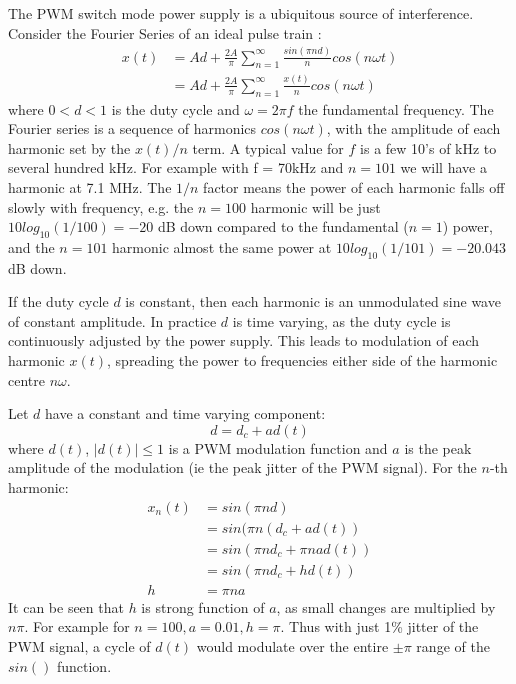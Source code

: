 \documentclass{article}
\begin{document}
The PWM switch mode power supply is a ubiquitous source of interference.  Consider the Fourier Series of an ideal pulse train \cite{wikipedia_pulse}:
\begin{equation} \label{eq_pwm}
\begin{split}
x(t) &= Ad+\frac{2A}{\pi} \sum_{n=1}^{\infty} \frac{sin(\pi n d)}{n}cos(n \omega t) \\
     &= Ad+\frac{2A}{\pi} \sum_{n=1}^{\infty} \frac{x(t)}{n} cos(n \omega t)
\end{split}
\end{equation}
where $0<d<1$ is the duty cycle and $\omega=2 \pi f$ the fundamental frequency.  The Fourier series is a sequence of harmonics $cos(n \omega t)$, with the amplitude of each harmonic set by the $x(t)/n$ term. A typical value for $f$ is a few 10's of kHz to several hundred kHz. For example with f = 70kHz and $n=101$ we will have a harmonic at 7.1 MHz. The $1/n$ factor means the power of each harmonic falls off slowly with frequency, e.g. the $n=100$ harmonic will be just $10log_{10}(1/100)=-20$ dB down compared to the fundamental ($n=1$) power, and the $n=101$ harmonic almost the same power at $10log_{10}(1/101)=-20.043$ dB down.

If the duty cycle $d$ is constant, then each harmonic is an unmodulated sine wave of constant amplitude. In practice $d$ is time varying, as the duty cycle is continuously adjusted by the power supply.  This leads to modulation of each harmonic $x(t)$, spreading the power to frequencies either side of the harmonic centre $n \omega$.

Let $d$ have a constant and time varying component:
\begin{equation}
d=d_c+ad(t)
\end{equation}
where $d(t)$, $|d(t)| \le 1$ is a PWM modulation function and $a$ is the peak amplitude of the modulation (ie the peak jitter of the PWM signal). For the $n$-th harmonic:
\begin{equation} \label{eq:pwm_n}
\begin{split}
x_n(t) &= sin(\pi n d) \\
       &= sin(\pi n (d_c+ad(t)) \\
       &= sin(\pi n d_c + \pi n a d(t)) \\
       &= sin(\pi n d_c + h d(t))  \\
     h &= \pi n a
\end{split}
\end{equation}
It can be seen that $h$ is strong function of $a$, as small changes are multiplied by $n \pi$. For example for $n=100, a=0.01, h = \pi$.  Thus with just 1\% jitter of the PWM signal, a cycle of $d(t)$ would modulate over the entire $\pm \pi$ range of the $sin()$ function.
\end{document}
